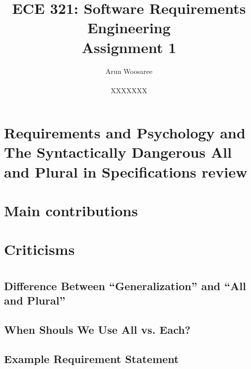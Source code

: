 \documentclass[letterpaper,12pt]{article}
\title{ECE 321: Software Requirements Engineering \\ Assignment 1}
\author{Arun Woosaree \\ \\ XXXXXXX}
\begin{document}
\maketitle

\section{Requirements and Psychology
  and
  The Syntactically Dangerous All and Plural in Specifications
  review}

\section{Main contributions}


\section{Criticisms} %

\section{}

\subsection{Difference Between ``Generalization'' and ``All and Plural''}

\subsection{When Shouls We Use All vs. Each?}

\subsection{Example Requirement Statement}
\end{document}
